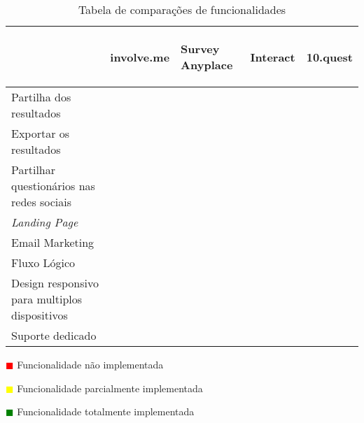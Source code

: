 \renewcommand{\arraystretch}{2}
\setlength\arrayrulewidth{1pt}
\begin{table}[!ht]  
	\begin{center}
		\begin{tabular}{|p{4cm}|p{0.1cm}|p{0.1cm}|p{0.1cm}|p{0.1cm}|}
			\cline{2-5}
			\multicolumn{1}{c|}{} & \hspace{0.2cm}\begin{sideways}involve.me\end{sideways} & \hspace{0.4cm}\begin{sideways}Survey Anyplace\end{sideways} & \hspace{0.2cm}\begin{sideways}Interact\end{sideways} &\hspace{0.2cm}\begin{sideways} 10.quest\end{sideways}\\ \hline
			
			
			Partilha dos resultados &\cellcolor{green!80}  & \cellcolor{green!80} & \cellcolor{green!80} & \cellcolor{green!80}  \\ \hline
			
			Exportar os resultados &  &  &  &  \\ \hline
			
			Partilhar questionários nas redes sociais &  &  &  &  \\ \hline
			
			\textit{Landing Page} &  &  &  &  \\ \hline
			
			Email Marketing &  &  &  &  \\ \hline
			
			Fluxo Lógico &  &  &  &  \\ \hline
			
			Design responsivo para multiplos dispositivos &  &  &  &  \\ \hline
			
			Suporte dedicado & \cellcolor{green!80}  & \cellcolor{green!80}  & \cellcolor{green!80} & \cellcolor{green!80} \\ \hline
			
			
			
			
		\end{tabular}
	\end{center}
	\hspace{1.2cm}	\textcolor{red}{$\blacksquare$} Funcionalidade não implementada
	
	\hspace{1.2cm}     \textcolor{yellow}{$\blacksquare$} Funcionalidade parcialmente implementada
	
	\hspace{1.2cm}     \textcolor{green}{$\blacksquare$} Funcionalidade totalmente implementada 
	\begin{center}
		\caption{Tabela de comparações de funcionalidades}
		\label{tab:comparacao1}
	\end{center}
\end{table}


